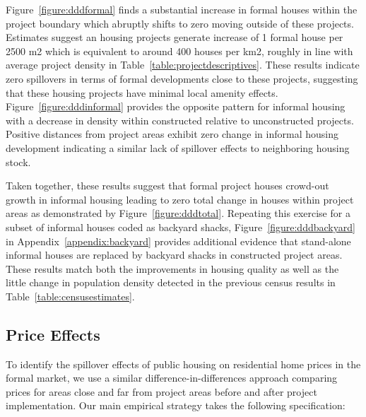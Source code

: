 \documentclass[12pt]{article}
\begin{document}
Figure~\ref{figure:dddformal} finds a substantial increase in formal houses within the project boundary which abruptly shifts to zero moving outside of these projects.  Estimates suggest an housing projects generate increase of 1 formal house per 2500 m2 which is equivalent to around 400 houses per km2, roughly in line with average project density in Table~\ref{table:projectdescriptives}.  These results indicate zero spillovers in terms of formal developments close to these projects, suggesting that these housing projects have minimal local amenity effects.  Figure~\ref{figure:dddinformal} provides the opposite pattern for informal housing with a decrease in density within constructed relative to unconstructed projects.  Positive distances from project areas exhibit zero change in informal housing development indicating a similar lack of spillover effects to neighboring housing stock.  

Taken together, these results suggest that formal project houses crowd-out growth in informal housing leading to zero total change in houses within project areas as demonstrated by Figure~\ref{figure:dddtotal}.  Repeating this exercise for a subset of informal houses coded as backyard shacks, Figure~\ref{figure:dddbackyard} in Appendix~\ref{appendix:backyard} provides additional evidence that stand-alone informal houses are replaced by backyard shacks in constructed project areas.  These results match both the improvements in housing quality as well as the little change in population density detected in the previous census results in Table~\ref{table:censusestimates}.


\subsection{Price Effects}\label{section:resultsprices}

To identify the spillover effects of public housing on residential home prices in the formal market, we use a similar difference-in-differences approach comparing prices for areas close and far from project areas before and after project implementation.  Our main empirical strategy takes the following specification:
\end{document}
